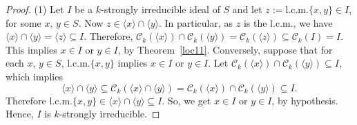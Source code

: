 \documentclass[11pt,english]{amsart}
\theoremstyle{definition}
\numberwithin{equation}{section}
\begin{document}
\begin{proof}
(1) Let $I$ be a $k$-strongly irreducible ideal of $S$ and let $z:=\mathrm{l.c.m.}\{x,y\} \in I$, for some $x$, $y \in S$. Now $z \in \langle x \rangle \cap \langle y \rangle$. In particular, as $z$ is the $\mathrm{l.c.m.}$, we have $\langle x \rangle \cap \langle y \rangle= \langle z \rangle \subseteq I$. Therefore, $\mathcal{C}_k(\langle x \rangle) \cap \mathcal{C}_k(\langle y \rangle) = \mathcal{C}_k(\langle z \rangle )\subseteq \mathcal{C}_k(I)=I.$ This implies $x \in I$ or $y \in I$, by Theorem~\ref{loc11}. Conversely, suppose that for each $x$, $y \in S $, $\mathrm{l.c.m.}\{x,y\}$ implies $x \in I$ or $y \in I$. Let $\mathcal{C}_k(\langle x \rangle) \cap \mathcal{C}_k(\langle y \rangle) \subseteq I$, which implies \[\langle x \rangle \cap \langle y \rangle \subseteq \mathcal{C}_k(\langle x \rangle \cap \langle y \rangle)= \mathcal{C}_k(\langle x \rangle) \cap \mathcal{C}_k(\langle y \rangle) \subseteq I.\] Therefore $\mathrm{l.c.m.}\{x,y\} \in \langle x \rangle \cap \langle y \rangle \subseteq I$. So, we get $x \in I$ or $y \in I$, by hypothesis. Hence, $I$ is $k$-strongly irreducible.

    

\end{proof}
\end{document}
